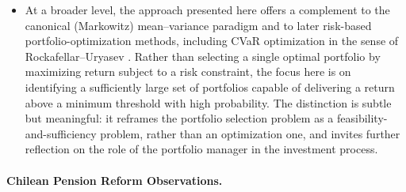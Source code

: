 \documentclass[11pt]{article}
\begin{document}
\begin{itemize}
\item At a broader level, the approach presented here offers a complement to the 
canonical (Markowitz) mean--variance paradigm and to later risk-based portfolio-optimization methods, including CVaR optimization in the sense of Rockafellar--Uryasev \cite{rockafellar2000}. Rather than selecting a single optimal portfolio by maximizing return 
subject to a risk constraint, the focus here is on identifying a 
sufficiently large set of portfolios capable of delivering a return 
above a minimum threshold with high probability. The distinction 
is subtle but meaningful: it reframes the portfolio selection problem as  a
feasibility-and-sufficiency problem, rather than an optimization 
one, and invites further reflection on the role of the portfolio 
manager in the investment process.


\end{itemize}

\paragraph{Chilean Pension Reform Observations.}
\end{document}

